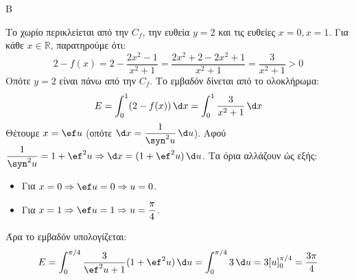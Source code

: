 \begin{thema}{Β}
\begin{erwthma}
\item Το χωρίο περικλείεται από την $C_f$, την ευθεία $y=2$ και τις ευθείες $x=0, x=1$.
Για κάθε $x \in \mathbb{R}$, παρατηρούμε ότι: 
\[2 - f(x) = 2 - \dfrac{2x^2-1}{x^2+1} = \dfrac{2x^2+2-2x^2+1}{x^2+1} = \dfrac{3}{x^2+1} > 0\]
Οπότε $y = 2$ είναι πάνω από την $C_f$. Το εμβαδόν δίνεται από το ολοκλήρωμα:
\[ E = \int_0^1 (2 - f(x))\,\d x = \int_0^1 \dfrac{3}{x^2+1}\,\d x \]
Θέτουμε $x = \ef u$ (οπότε $\d x = \dfrac{1}{\syn^2 u}\,\d u$).
Αφού $\dfrac{1}{\syn^2 u} = 1+\ef^2 u \Rightarrow \d x = (1+\ef^2 u)\,\d u$.
Τα όρια αλλάζουν ώς εξής: 
\begin{itemize}
\item Για $x=0 \Rightarrow \ef u = 0 \Rightarrow u=0$.
\item Για $x=1 \Rightarrow \ef u = 1 \Rightarrow u = \dfrac{\pi}{4}$.
\end{itemize}
Άρα το εμβαδόν υπολογίζεται:
\[ E = \int_0^{\pi/4} \dfrac{3}{\ef^2 u + 1}(1+\ef^2 u)\,\d u = \int_0^{\pi/4} 3\,\d u = 3[u]_0^{\pi/4} = \dfrac{3\pi}{4} \]
\end{erwthma}
\end{thema}


